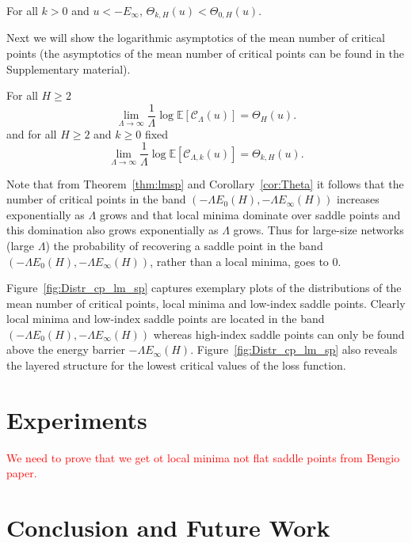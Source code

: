\documentclass[twoside]{article}
\begin{document}
\begin{corollary}
For all $k > 0$ and $u < -E_{\infty}$, $\Theta_{k,H}(u) < \Theta_{0,H}(u)$.
\label{cor:Theta}
\end{corollary}

Next we will show the logarithmic asymptotics of the mean number of critical points (the asymptotics of the mean number of critical points can be found in the Supplementary material). 
\begin{theorem}
For all $H \geq 2$
\[\lim_{\Lambda \rightarrow \infty}\frac{1}{\Lambda}\log\mathbb{E}[\mathcal{C}_{\Lambda}(u)] = \Theta_{H}(u).
\]
and for all $H \geq 2$ and $k \geq 0$ fixed
\[\lim_{\Lambda \rightarrow \infty}\frac{1}{\Lambda}\log\mathbb{E}[\mathcal{C}_{\Lambda,k}(u)] = \Theta_{k,H}(u).
\]
\label{thm:lmsp}
\end{theorem}
Note that from Theorem~\ref{thm:lmsp} and Corollary~\ref{cor:Theta} it follows that the number of critical points in the band $\left(-\Lambda E_0(H),-\Lambda E_{\infty}(H)\right)$ increases exponentially as $\Lambda$ grows and that local minima dominate over saddle points and this domination also grows exponentially as $\Lambda$ grows. Thus for large-size networks (large $\Lambda$) the probability of recovering a saddle point in the band $\left(-\Lambda E_0(H),-\Lambda E_{\infty}(H)\right)$, rather than a local minima, goes to $0$.

Figure~\ref{fig:Distr_cp_lm_sp} captures exemplary plots of the distributions of the mean number of critical points, local minima and low-index saddle points. Clearly local minima and low-index saddle points are located in the band $\left(-\Lambda E_0(H),-\Lambda E_{\infty}(H)\right)$ whereas high-index saddle points can only be found above the energy barrier $-\Lambda E_{\infty}(H)$. Figure~\ref{fig:Distr_cp_lm_sp} also reveals the layered structure for the lowest critical values of the loss function. 

\section{Experiments}
\label{sec:Experiments}

\textcolor{red}{We need to prove that we get ot local minima not flat saddle points from Bengio paper.}

\section{Conclusion and Future Work}
\label{sec:ConandFutWork}
\end{document}
